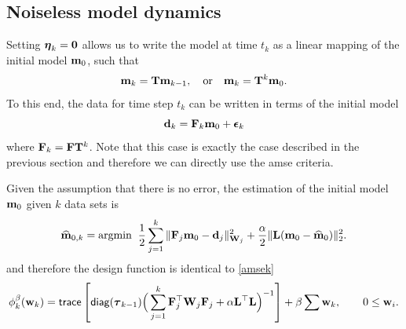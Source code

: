 \documentclass[11pt]{article}
\newcommand{\bfF}	{{\bf{F}}}
\newcommand{\bfI}	{{\bf{I}}}
\newcommand{\bfL}	{{\bf{L}}}
\newcommand{\bfT}	{{\bf{T}}}
\newcommand{\bfW}	{{\bf{W}}}
\newcommand{\bfd}	{{\bf{d}}}
\newcommand{\bfe}	{{\bf{e}}}
\newcommand{\bfm}	{{\bf{m}}}
\newcommand{\bfw}	{{\bf{w}}}
\newcommand{\hf}        {{\frac 12}}
\newcommand{\bfepsilon} {{\boldsymbol \epsilon}}
\newcommand{\bfeta}     {{\boldsymbol \eta}}
\newcommand{\bftau}      {{\boldsymbol \tau}}
\newcommand{\LtL}       { \bfL^{\top}\bfL}
\newcommand {\zero}  { {\bf 0} }
\renewcommand{\hf}		 {\frac12}
\newcommand{\bfmhat}    {{\widehat{\bfm}}}
\begin{document}
\subsection{Noiseless model dynamics}

Setting $\bfeta_k = \zero$ allows us to 
write the model at time $t_k$ as a linear mapping of the initial model $\bfm_0$, such that
\begin{align*}
\bfm_{k} = \bfT\bfm_{k-1}, \quad {\rm or } \quad
\bfm_{k} = \bfT^{k}\bfm_0.
\end{align*} 
To this end, the data for time step $t_k$ can be written in terms of the initial model 
\begin{equation}
\bfd_k = \bfF_k\bfm_0 + \bfepsilon_k
\end{equation}
where $\bfF_k = \bfF\bfT^{k}$.
Note that this case is exactly the case described in the previous section and therefore we can
directly use the amse criteria.

Given the assumption that there is no error, the estimation of the initial model $\bfm_0$ given $k$ data sets is 
\begin{equation}
\label{m0NoNoise}
\bfmhat_{0,k} ={\rm argmin } \;\; \hf  \sum_{j=1}^{k}\| \bfF_{j}\bfm_0 - \bfd_j \|_{\bfW_j}^2 + \frac{\alpha}{2}\|\bfL(\bfm_0 - \bfmhat_{0})\|_2^2.
\end{equation}
and therefore the design function is identical to \ref{amsek}
\begin{align}
\phi_{k}^{\beta}(\bfw_{k}) =  {\sf trace} \left[  {\sf diag}(\bftau_{k-1}) \Big(\sum_{j=1}^{k}\bfF_{j}^{\top}\bfW_{j}\bfF_{j}   +
\alpha \LtL\Big)^{-1} \right] + \beta \sum \bfw_{k},\quad \quad 0 \le \bfw_i.
\end{align}

\end{document}
